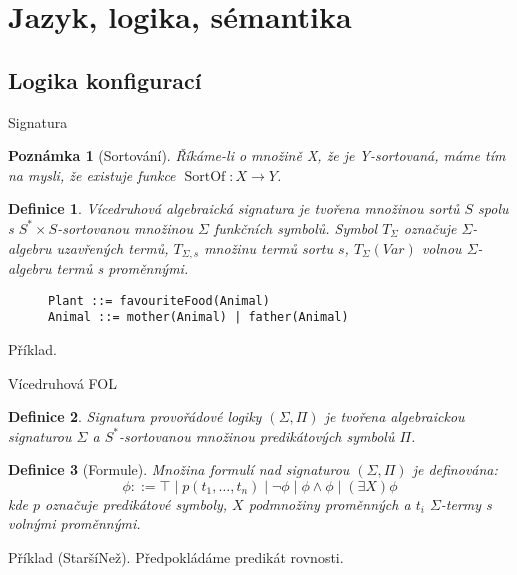 \documentclass[11pt]{beamer}
\newtheorem{dfn}{Definice}
\newtheorem{pozn}{Poznámka}
\DeclareMathOperator{\SortOf}{SortOf}
\newcommand{\Var}{\mathit{Var}}
\begin{document}
\section{Jazyk, logika, sémantika}

\subsection{Logika konfigurací}

\begin{frame}[fragile]{Signatura}

\begin{pozn}[Sortování]
Říkáme-li o množině X, že je Y-sortovaná, máme tím na mysli, že existuje funkce $\SortOf : X \rightarrow Y $.
\end{pozn}

\pause

\begin{dfn}
\textit{Vícedruhová algebraická signatura} je tvořena množinou sortů $S$ spolu s $S^* \times S$-sortovanou množinou $\Sigma$ funkčních symbolů. Symbol $T_{\Sigma}$ označuje $\Sigma$-algebru uzavřených termů, $T_{\Sigma , s}$ množinu termů sortu $s$, $T_{\Sigma}\left( \Var \right)$ volnou $\Sigma$-algebru termů s proměnnými.
\end{dfn}

\pause

\begin{figure}
\begin{lstlisting}
Plant ::= favouriteFood(Animal)
Animal ::= mother(Animal) | father(Animal)
\end{lstlisting}
\end{figure}

\pause

Příklad.

\end{frame}


\begin{frame}{Vícedruhová FOL}

\begin{dfn}
Signatura provořádové logiky $\left( \Sigma, \Pi \right)$ je tvořena algebraickou signaturou $\Sigma$ a $S^*$-sortovanou množinou predikátových symbolů $\Pi$.
\end{dfn}

\pause

\begin{dfn}[Formule]
Množina formulí nad signaturou $\left( \Sigma, \Pi \right)$ je definována:
\begin{equation*}
\phi ::= \top \mid p(t_1,\ldots,t_n) \mid \neg \phi \mid \phi \land \phi \mid \left( \exists X \right) \phi
\end{equation*}
kde $p$ označuje predikátové symboly, $X$ podmnožiny proměnných a $t_i$ $\Sigma$-termy s volnými proměnnými.
\end{dfn}

\pause
Příklad (StaršíNež).
\pause
Předpokládáme predikát rovnosti.

\end{frame}
\end{document}
